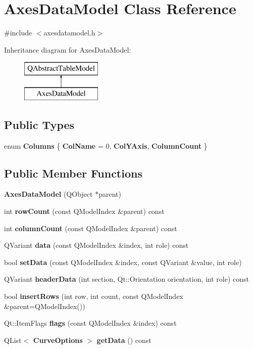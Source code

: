 \section{Axes\+Data\+Model Class Reference}
\label{classAxesDataModel}


{\ttfamily \#include $<$axesdatamodel.\+h$>$}

Inheritance diagram for Axes\+Data\+Model\+:\begin{figure}[H]
\begin{center}
\leavevmode
\includegraphics[height=2.000000cm]{classAxesDataModel}
\end{center}
\end{figure}
\subsection*{Public Types}
\begin{DoxyCompactItemize}
\item 
enum {\bf Columns} \{ {\bf Col\+Name} = 0, 
{\bf Col\+Y\+Axis}, 
{\bf Column\+Count}
 \}
\end{DoxyCompactItemize}
\subsection*{Public Member Functions}
\begin{DoxyCompactItemize}
\item 
{\bf Axes\+Data\+Model} (Q\+Object $\ast$parent)
\item 
int {\bf row\+Count} (const Q\+Model\+Index \&parent) const 
\item 
int {\bf column\+Count} (const Q\+Model\+Index \&parent) const 
\item 
Q\+Variant {\bf data} (const Q\+Model\+Index \&index, int role) const 
\item 
bool {\bf set\+Data} (const Q\+Model\+Index \&index, const Q\+Variant \&value, int role)
\item 
Q\+Variant {\bf header\+Data} (int section, Qt\+::\+Orientation orientation, int role) const 
\item 
bool {\bf insert\+Rows} (int row, int count, const Q\+Model\+Index \&parent=Q\+Model\+Index())
\item 
Qt\+::\+Item\+Flags {\bf flags} (const Q\+Model\+Index \&index) const 
\item 
Q\+List$<$ {\bf Curve\+Options} $>$ {\bf get\+Data} () const 
\end{DoxyCompactItemize}


